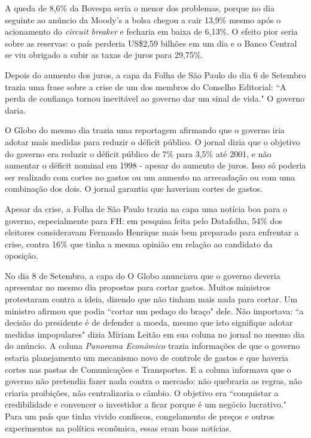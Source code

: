 \documentclass{article}
\begin{document}
A queda de 8,6\% da Bovespa seria o menor dos problemas, porque no dia seguinte ao anúncio da Moody's a bolsa chegou a cair 13,9\% mesmo após o acionamento do \textit{circuit breaker} e fecharia em baixa de 6,13\%. O efeito pior seria sobre as reservas: o país perderia US\$2,59 bilhões em um dia e o Banco Central se viu obrigado a subir as taxas de juros para 29,75\%.

Depois do aumento dos juros, a capa da Folha de São Paulo do dia 6 de Setembro trazia uma frase sobre a crise de um dos membros do Conselho Editorial: ``A perda de confiança tornou inevitável ao governo dar um sinal de vida." O governo daria.

O Globo do mesmo dia trazia uma reportagem afirmando que o governo iria adotar mais medidas para reduzir o déficit público. O jornal dizia que o objetivo do governo era reduzir o déficit público de 7\% para 3,5\% até 2001, e não aumentar o déficit nominal em 1998 - apesar do aumento de juros. Isso só poderia ser realizado com cortes no gastos ou um aumento na arrecadação ou com uma combinação dos dois. O jornal garantia que haveriam cortes de gastos. 

Apesar da crise, a Folha de São Paulo trazia na capa uma notícia boa para o governo, especialmente para FH: em pesquisa feita pelo Datafolha, 54\% dos eleitores consideravam Fernando Henrique mais bem preparado para enfrentar a crise, contra 16\% que tinha a mesma opinião em relação ao candidato da oposição. 

No dia 8 de Setembro, a capa do O Globo anunciava que o governo deveria apresentar no mesmo dia propostas para cortar gastos. Muitos ministros protestaram contra a ideia, dizendo que não tinham mais nada para cortar. Um ministro afirmou que podia ``cortar um pedaço do braço" dele. Não importava: ``a decisão do presidente é de defender a moeda, mesmo que isto signifique adotar medidas impopulares" dizia Míriam Leitão em sua coluna no jornal no mesmo dia do anúncio. A coluna \textit{Panorama Econômico} trazia informações de que o governo estaria planejamento um mecanismo novo de controle de gastos e que haveria cortes nas pastas de Comunicações e Transportes. E a coluna informava que o governo não pretendia fazer nada contra o mercado: não quebraria as regras, não criaria proibições, não centralizaria o câmbio. O objetivo era ``conquistar a credibilidade e convencer o investidor a ficar porque é um negócio lucrativo." Para um país que tinha vivido confiscos, congelamento de preços e outros experimentos na política econômica, essas eram boas notícias.
\end{document}
